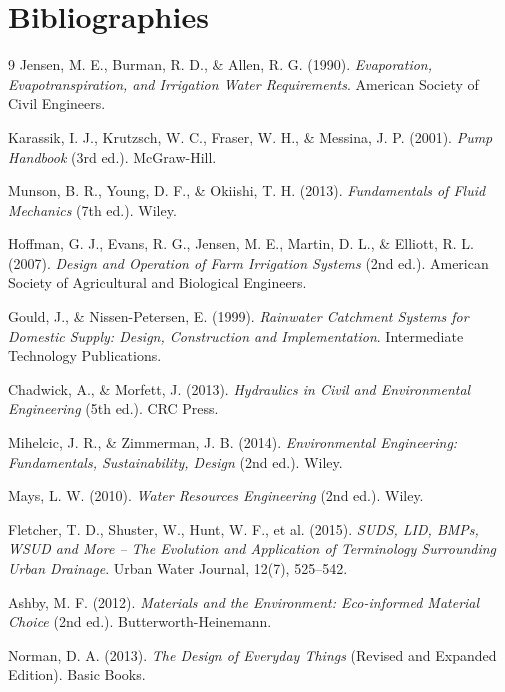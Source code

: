 \documentclass[12pt]{report}
\begin{document}
\part{Bibliographies}
\renewcommand{\bibname}{Chapter 2 Bibliography}
\begin{thebibliography}{9}
    Jensen, M. E., Burman, R. D., \& Allen, R. G. (1990). \emph{Evaporation, Evapotranspiration, and Irrigation Water Requirements}. American Society of Civil Engineers.
    
    Karassik, I. J., Krutzsch, W. C., Fraser, W. H., \& Messina, J. P. (2001). \emph{Pump Handbook} (3rd ed.). McGraw-Hill.
    
    Munson, B. R., Young, D. F., \& Okiishi, T. H. (2013). \emph{Fundamentals of Fluid Mechanics} (7th ed.). Wiley.
    
    Hoffman, G. J., Evans, R. G., Jensen, M. E., Martin, D. L., \& Elliott, R. L. (2007). \emph{Design and Operation of Farm Irrigation Systems} (2nd ed.). American Society of Agricultural and Biological Engineers.
    
    Gould, J., \& Nissen-Petersen, E. (1999). \emph{Rainwater Catchment Systems for Domestic Supply: Design, Construction and Implementation}. Intermediate Technology Publications.
    
    Chadwick, A., \& Morfett, J. (2013). \emph{Hydraulics in Civil and Environmental Engineering} (5th ed.). CRC Press.
    
    Mihelcic, J. R., \& Zimmerman, J. B. (2014). \emph{Environmental Engineering: Fundamentals, Sustainability, Design} (2nd ed.). Wiley.
    
    Mays, L. W. (2010). \emph{Water Resources Engineering} (2nd ed.). Wiley.
    
    Fletcher, T. D., Shuster, W., Hunt, W. F., et al. (2015). \emph{SUDS, LID, BMPs, WSUD and More – The Evolution and Application of Terminology Surrounding Urban Drainage}. Urban Water Journal, 12(7), 525–542.
    
    Ashby, M. F. (2012). \emph{Materials and the Environment: Eco-informed Material Choice} (2nd ed.). Butterworth-Heinemann.
    
    Norman, D. A. (2013). \emph{The Design of Everyday Things} (Revised and Expanded Edition). Basic Books.
    

\end{thebibliography}
\end{document}
